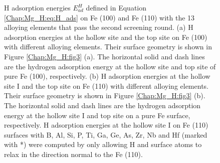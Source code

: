 \newpage
\begingroup
\begin{figure}[!ht]
  \centering
  \label{Chap:Mg_H:fig:8a}
  \label{Chap:Mg_H:fig:8b}
\caption[H adsorption energies on Fe (100) and Fe (110) with the 13 alloying elements that pass the second screening round]{H adsorption energies $E_{ad}^H$ defined in Equation \ref{Chap:Mg_H:eq:H_ads} on Fe (100) and Fe (110) with the 13 alloying elements that pass the second screening round.  (a) H adsorption energies at the hollow site and the top site on Fe (100) with different alloying elements. Their surface geometry is shown in Figure \ref{Chap:Mg_H:fig3} (a). The horizontal solid and dash lines are the hydrogen adsorption energy at the hollow site and top site of pure Fe (100), respectively. (b) H adsorption energies at the hollow site I and the top site on Fe (110) with different alloying elements. Their surface geometry is shown in Figure \ref{Chap:Mg_H:fig3} (b). The horizontal solid and dash lines are the hydrogen adsorption energy at the hollow site I and top site on a pure Fe surface, respectively. H adsorption energies at the hollow site I on Fe (110) surfaces with B, Al, Si, P, Ti, Ga, Ge, As, Zr, Nb and Hf (marked with *) were computed by only allowing H and surface atoms to relax in the direction normal to the Fe (110).}
  \label{Chap:Mg_H:fig8}
\end{figure}
\endgroup